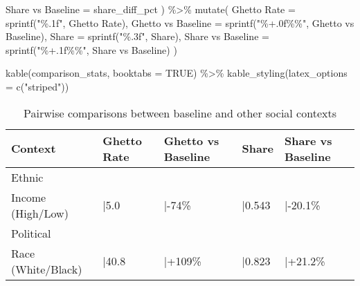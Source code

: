 \documentclass[
  11pt,
]{article}
\newenvironment{Shaded}{\begin{snugshade}}{\end{snugshade}}
\newcommand{\AttributeTok}[1]{\textcolor[rgb]{0.40,0.45,0.13}{#1}}
\newcommand{\ConstantTok}[1]{\textcolor[rgb]{0.56,0.35,0.01}{#1}}
\newcommand{\FunctionTok}[1]{\textcolor[rgb]{0.28,0.35,0.67}{#1}}
\newcommand{\NormalTok}[1]{\textcolor[rgb]{0.00,0.23,0.31}{#1}}
\newcommand{\OtherTok}[1]{\textcolor[rgb]{0.00,0.23,0.31}{#1}}
\newcommand{\SpecialCharTok}[1]{\textcolor[rgb]{0.37,0.37,0.37}{#1}}
\newcommand{\StringTok}[1]{\textcolor[rgb]{0.13,0.47,0.30}{#1}}
\begin{document}
\begin{Shaded}
\begin{Highlighting}[]
    \StringTok{\textasciigrave{}}\AttributeTok{Share vs Baseline}\StringTok{\textasciigrave{}} \OtherTok{=}\NormalTok{ share\_diff\_pct}
\NormalTok{  ) }\SpecialCharTok{\%\textgreater{}\%}
  \FunctionTok{mutate}\NormalTok{(}
    \StringTok{\textasciigrave{}}\AttributeTok{Ghetto Rate}\StringTok{\textasciigrave{}} \OtherTok{=} \FunctionTok{sprintf}\NormalTok{(}\StringTok{"\%.1f"}\NormalTok{, }\StringTok{\textasciigrave{}}\AttributeTok{Ghetto Rate}\StringTok{\textasciigrave{}}\NormalTok{),}
    \StringTok{\textasciigrave{}}\AttributeTok{Ghetto vs Baseline}\StringTok{\textasciigrave{}} \OtherTok{=} \FunctionTok{sprintf}\NormalTok{(}\StringTok{"\%+.0f\%\%"}\NormalTok{, }\StringTok{\textasciigrave{}}\AttributeTok{Ghetto vs Baseline}\StringTok{\textasciigrave{}}\NormalTok{),}
    \StringTok{\textasciigrave{}}\AttributeTok{Share}\StringTok{\textasciigrave{}} \OtherTok{=} \FunctionTok{sprintf}\NormalTok{(}\StringTok{"\%.3f"}\NormalTok{, }\StringTok{\textasciigrave{}}\AttributeTok{Share}\StringTok{\textasciigrave{}}\NormalTok{),}
    \StringTok{\textasciigrave{}}\AttributeTok{Share vs Baseline}\StringTok{\textasciigrave{}} \OtherTok{=} \FunctionTok{sprintf}\NormalTok{(}\StringTok{"\%+.1f\%\%"}\NormalTok{, }\StringTok{\textasciigrave{}}\AttributeTok{Share vs Baseline}\StringTok{\textasciigrave{}}\NormalTok{)}
\NormalTok{  )}

\FunctionTok{kable}\NormalTok{(comparison\_stats, }\AttributeTok{booktabs =} \ConstantTok{TRUE}\NormalTok{) }\SpecialCharTok{\%\textgreater{}\%}
  \FunctionTok{kable\_styling}\NormalTok{(}\AttributeTok{latex\_options =} \FunctionTok{c}\NormalTok{(}\StringTok{"striped"}\NormalTok{))}
\end{Highlighting}
\end{Shaded}

\begin{longtable}[t]{lllll}
\caption{Pairwise comparisons between baseline and other social contexts}\tabularnewline

\toprule
Context & Ghetto Rate & Ghetto vs Baseline & Share & Share vs Baseline\\
\midrule
Ethnic
\cellcolor{gray!10}{(Asian/Hispanic)} & \cellcolor{gray!10}{|38.9} & \cellcolor{gray!10}{|+100\%} & \cellcolor{gray!10}{|0.821} & \cellcolor{gray!10}{|+20.9\%}\\
Income
(High/Low) & |5.0 & |-74\% & |0.543 & |-20.1\%\\
Political
\cellcolor{gray!10}{(Liberal/Conservative)} & \cellcolor{gray!10}{|61.6} & \cellcolor{gray!10}{|+216\%} & \cellcolor{gray!10}{|0.928} & \cellcolor{gray!10}{|+36.6\%}\\
Race
(White/Black) & |40.8 & |+109\% & |0.823 & |+21.2\%\\
\bottomrule
\end{longtable}
\end{document}
